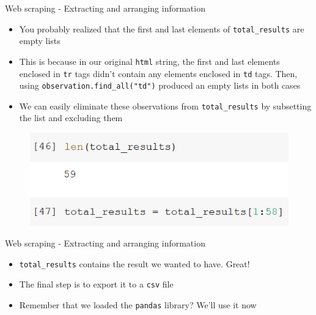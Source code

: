 \documentclass[aspectratio=169]{beamer}
\begin{document}
\begin{frame}{Web scraping - Extracting and arranging information}

	\begin{itemize}	
		\item You probably realized that the first and last elements of \texttt{total\_results} are empty lists
		\item This is because in our original \texttt{html} string, the first and last elements enclosed in \texttt{tr} tags didn't contain any elements enclosed in \texttt{td} tags. Then, using \texttt{observation.find\_all("td")} produced an empty lists in both cases
		\item We can easily eliminate these observations from \texttt{total\_results} by subsetting the list and excluding them
	\end{itemize}

	\begin{figure}
		\centering
		\includegraphics[width=0.6\linewidth]{img/total_results_subsetting.png}
	\end{figure}

\end{frame}

\begin{frame}{Web scraping - Extracting and arranging information}

	\begin{itemize}
		\item \texttt{total\_results} contains the result we wanted to have. Great!
		\item The final step is to export it to a \texttt{csv} file
		\item Remember that we loaded the \texttt{pandas} library? We'll use it now
	\end{itemize}

\end{frame}
\end{document}
